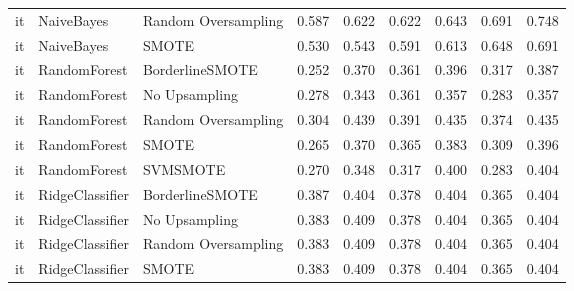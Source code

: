 \begin{tabular}{lllllllll}
      it &                      NaiveBayes &           Random Oversampling & 0.587 &                     0.622 &                 0.622 &                  0.643 &                                   0.691 &     0.748 \\
      it &                      NaiveBayes &                         SMOTE & 0.530 &                     0.543 &                 0.591 &                  0.613 &                                   0.648 &     0.691 \\
      it &                    RandomForest &               BorderlineSMOTE & 0.252 &                     0.370 &                 0.361 &                  0.396 &                                   0.317 &     0.387 \\
      it &                    RandomForest &                 No Upsampling & 0.278 &                     0.343 &                 0.361 &                  0.357 &                                   0.283 &     0.357 \\
      it &                    RandomForest &           Random Oversampling & 0.304 &                     0.439 &                 0.391 &                  0.435 &                                   0.374 &     0.435 \\
      it &                    RandomForest &                         SMOTE & 0.265 &                     0.370 &                 0.365 &                  0.383 &                                   0.309 &     0.396 \\
      it &                    RandomForest &                      SVMSMOTE & 0.270 &                     0.348 &                 0.317 &                  0.400 &                                   0.283 &     0.404 \\
      it &                 RidgeClassifier &               BorderlineSMOTE & 0.387 &                     0.404 &                 0.378 &                  0.404 &                                   0.365 &     0.404 \\
      it &                 RidgeClassifier &                 No Upsampling & 0.383 &                     0.409 &                 0.378 &                  0.404 &                                   0.365 &     0.404 \\
      it &                 RidgeClassifier &           Random Oversampling & 0.383 &                     0.409 &                 0.378 &                  0.404 &                                   0.365 &     0.404 \\
      it &                 RidgeClassifier &                         SMOTE & 0.383 &                     0.409 &                 0.378 &                  0.404 &                                   0.365 &     0.404 \\

\end{tabular}
